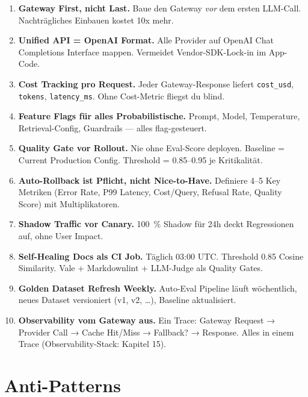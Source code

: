 \begin{enumerate}[leftmargin=*]
    \item \textbf{Gateway First, nicht Last.} Baue den Gateway \textit{vor} dem ersten LLM-Call. Nachträgliches Einbauen kostet 10x mehr.
    \item \textbf{Unified API = OpenAI Format.} Alle Provider auf OpenAI Chat Completions Interface mappen. Vermeidet Vendor-SDK-Lock-in im App-Code.
    \item \textbf{Cost Tracking pro Request.} Jeder Gateway-Response liefert \texttt{cost\_usd}, \texttt{tokens}, \texttt{latency\_ms}. Ohne Cost-Metric fliegst du blind.
    \item \textbf{Feature Flags für alles Probabilistische.} Prompt, Model, Temperature, Retrieval-Config, Guardrails — alles flag-gesteuert.
    \item \textbf{Quality Gate vor Rollout.} Nie ohne Eval-Score deployen. Baseline = Current Production Config. Threshold = 0.85–0.95 je Kritikalität.
    \item \textbf{Auto-Rollback ist Pflicht, nicht Nice-to-Have.} Definiere 4–5 Key Metriken (Error Rate, P99 Latency, Cost/Query, Refusal Rate, Quality Score) mit Multiplikatoren.
\item \textbf{Shadow Traffic vor Canary.} 100~\% Shadow für 24h deckt Regressionen auf, ohne User Impact.
\item \textbf{Self-Healing Docs als CI Job.} Täglich 03:00 UTC. Threshold 0.85 Cosine Similarity. Vale + Markdownlint + LLM-Judge als Quality Gates.
\item \textbf{Golden Dataset Refresh Weekly.} Auto-Eval Pipeline läuft wöchentlich, neues Dataset versioniert (v1, v2, …), Baseline aktualisiert.
\item \textbf{Observability vom Gateway aus.} Ein Trace: Gateway Request → Provider Call → Cache Hit/Miss → Fallback? → Response. Alles in einem Trace (Observability-Stack: Kapitel 15).
\end{enumerate}

\section{Anti-Patterns}

